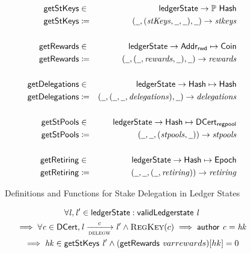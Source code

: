 \begin{figure}[ht]
  \centering
  \begin{align*}
    \fun{getStKeys} & \in & \ledgerState \to \powerset \Hash \\
    \fun{getStKeys} & \coloneqq & (\wcard, (\var{stKeys}, \wcard, \wcard),
                                  \wcard) \to \var{stkeys} \\
                    &&\\
    \fun{getRewards} & \in & \ledgerState \to \AddrRWD \mapsto \Coin \\
    \fun{getRewards} & \coloneqq & (\wcard, (\wcard, \var{rewards}, \wcard),
                                   \wcard) \to \var{rewards} \\
                    &&\\
    \fun{getDelegations} & \in & \ledgerState \to \Hash \mapsto \Hash \\
    \fun{getDelegations} & \coloneqq & (\wcard, (\wcard, \wcard,
                                       \var{delegations}), \wcard) \to
                                       \var{delegations} \\
                    &&\\
    \fun{getStPools} & \in & \ledgerState \to \Hash \mapsto \DCertRegPool \\
    \fun{getStPools} & \coloneqq & (\wcard, \wcard,
                                   (\var{stpools}, \wcard)) \to \var{stpools} \\
                    &&\\
    \fun{getRetiring} & \in & \ledgerState \to \Hash \mapsto \Epoch \\
    \fun{getRetiring} & \coloneqq & (\wcard, \wcard,
                                    (\wcard, \var{retiring})) \to \var{retiring} \\
  \end{align*}
  \caption{Definitions and Functions for Stake Delegation in Ledger States}
  \label{fig:stake-delegation-functions}
\end{figure}


\begin{property}
  \begin{multline*}
    \forall \var{l}, \var{l'} \in \ledgerState: \applyFun{validLedgerstate}{l}\\
    \implies \forall \var{c} \in \DCert, \var{l} \trans{delegw}{c} \var{l'}
    \wedge \RegKey{c} \implies \applyFun{author}{c} = \var{hk}\\ \implies
    \var{hk} \in \applyFun{getStKeys}{l'} \wedge
    (\applyFun{getRewards}var{rewards})[hk] = 0
  \end{multline*}
  \label{prop:ledger-properties-6}
\end{property}

